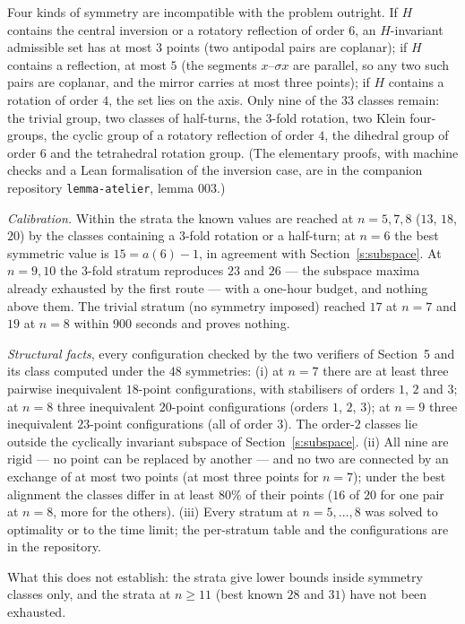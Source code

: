 \documentclass[11pt,a4paper]{article}
\begin{document}
Four kinds of symmetry are incompatible with the problem outright.  If $H$ contains the central
inversion or a rotatory reflection of order $6$, an $H$-invariant admissible set has at most $3$
points (two antipodal pairs are coplanar); if $H$ contains a reflection, at most $5$ (the segments
$x$--$\sigma x$ are parallel, so any two such pairs are coplanar, and the mirror carries at most
three points); if $H$ contains a rotation of order $4$, the set lies on the axis.  Only nine of the
$33$ classes remain: the trivial group, two classes of half-turns, the $3$-fold rotation, two
Klein four-groups, the cyclic group of a rotatory reflection of order $4$, the dihedral group
of order $6$ and the tetrahedral rotation group.  (The elementary proofs, with machine checks
and a Lean formalisation of the inversion case, are in the companion repository
\texttt{lemma-atelier}, lemma 003.)

\emph{Calibration.}  Within the strata the known values are reached at $n=5,7,8$ ($13$, $18$,
$20$) by the classes containing a $3$-fold rotation or a half-turn; at $n=6$ the best symmetric
value is $15=a(6)-1$, in agreement with Section~\ref{s:subspace}.  At $n=9,10$ the $3$-fold
stratum reproduces $23$ and $26$ --- the subspace maxima already exhausted by the first route ---
with a one-hour budget, and nothing above them.  The trivial stratum (no symmetry imposed)
reached $17$ at $n=7$ and $19$ at $n=8$ within $900$ seconds and proves nothing.

\emph{Structural facts}, every configuration checked by the two verifiers of Section~5 and its
class computed under the $48$ symmetries: (i) at $n=7$ there are at least three pairwise
inequivalent $18$-point configurations, with stabilisers of orders $1$, $2$ and $3$; at $n=8$
three inequivalent $20$-point configurations (orders $1$, $2$, $3$); at $n=9$ three inequivalent
$23$-point configurations (all of order $3$).  The order-$2$ classes lie outside the cyclically
invariant subspace of Section~\ref{s:subspace}.  (ii) All nine are rigid --- no point can be
replaced by another --- and no two are connected by an exchange of at most two points (at most
three points for $n=7$); under the best alignment the classes differ in at least $80\%$ of
their points ($16$ of $20$ for one pair at $n=8$, more for the others).  (iii) Every stratum at $n=5,\dots,8$ was solved to optimality or to the time limit;
the per-stratum table and the configurations are in the repository.

What this does not establish: the strata give lower bounds inside symmetry classes only, and the
strata at $n\ge11$ (best known $28$ and $31$) have not been exhausted.
\end{document}
